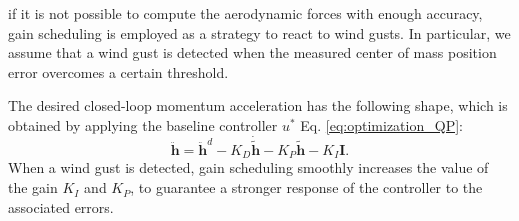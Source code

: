 if it is not possible to compute the aerodynamic forces with enough accuracy, gain scheduling is employed as a strategy to react to wind gusts. In particular, we assume that a wind gust is detected when the measured center of mass position error overcomes a certain threshold.

The desired closed-loop momentum acceleration has the following shape, which is obtained by applying the baseline controller $u^*$ Eq. \eqref{eq:optimization_QP}:
\begin{equation}
\label{eq:hddot_des}
   \ddot{\boldsymbol{h}} = \ddot{\boldsymbol{h}}^d -K_D\dot{\tilde{\boldsymbol{h}}} -K_P\tilde{{\boldsymbol{h}}} -K_I \boldsymbol{I}.
\end{equation}
When a wind gust is detected, gain scheduling smoothly increases the value of the gain $K_I$ and $K_P$, to guarantee a stronger response of the controller to the associated errors.




